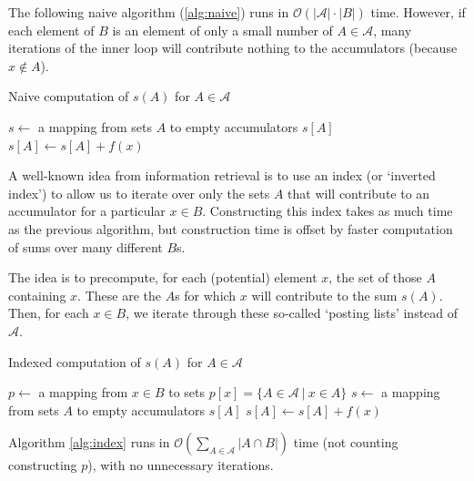 \documentclass[twocolumn,10pt]{article}
\begin{document}
The following naive algorithm (\ref{alg:naive}) runs in
$\mathcal{O}(|\mathcal{A}|\cdot|B|)$ time.
However, if each element of $B$ is an element of only a small
number of $A \in\mathcal{A}$, many iterations of the inner loop
will contribute nothing to the accumulators (because $x \notin A$).

\begin{algorithm}
\caption{Naive computation of $s(A)$ for $A \in \mathcal{A}$}
\label{alg:naive}
\begin{algorithmic}
    \State $s \gets$ a mapping from sets $A$ to empty accumulators $s[A]$
                \State $s[A] \gets s[A] + f(x)$
            \EndIf
        \EndFor
    \EndFor
\end{algorithmic}
\end{algorithm}

A well-known idea from information retrieval is to use an
index (or `inverted index') to allow us to iterate over only
the sets $A$ that will contribute to an accumulator for a particular
$x\in B$. Constructing this index takes as much time as the previous
algorithm, but construction time is offset by faster computation of
sums over many different $B$s.

The idea is to precompute, for each (potential) element $x$, the set
of those $A$ containing $x$. These are the $A$s for which $x$ will
contribute to the sum $s(A)$.
Then, for each $x\in B$, we iterate through these so-called `posting
lists' instead of $\mathcal{A}$.

\begin{algorithm}
\caption{Indexed computation of $s(A)$ for $A \in \mathcal{A}$}
\label{alg:index}
\begin{algorithmic}
    \State $p \gets$ a mapping from $x \in B$ to sets $p[x] = \{ A \in \mathcal{A} \ |\  x \in A \}$
    \State $s \gets$ a mapping from sets $A$ to empty accumulators $s[A]$
            \State $s[A] \gets s[A] + f(x)$
        \EndFor
    \EndFor
\end{algorithmic}
\end{algorithm}

Algorithm \ref{alg:index} runs in $\mathcal{O}(\sum_{A \in \mathcal{A}} |A \cap B|)$
time (not counting constructing $p$), with no unnecessary iterations.
\end{document}
